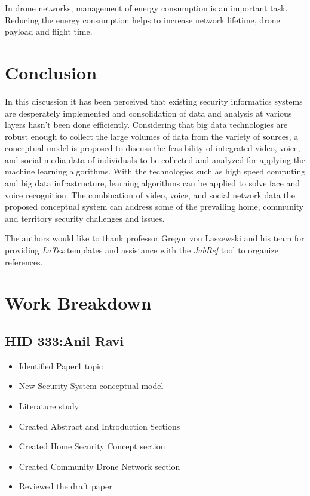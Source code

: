 \documentclass[sigconf]{acmart}
\begin{document}
In drone networks, management of energy consumption is an important task. Reducing the energy consumption helps to increase network lifetime, drone payload and flight time\cite{Gupta2015}.


\section{Conclusion}
In this discussion it has been perceived that existing security informatics systems are desperately implemented and consolidation of data and analysis at various layers hasn't been done efficiently. Considering that big data technologies are robust enough to collect the large volumes of data from the variety of sources, a conceptual model is proposed to discuss the feasibility of integrated video, voice, and social media data of individuals to be collected and analyzed for applying the machine learning algorithms. With the technologies such as high speed computing and big data infrastructure, learning algorithms can be applied to solve face and voice recognition. The combination of video, voice, and social network data the proposed conceptual system can address some of the prevailing home, community and territory security challenges and issues.

\begin{acks}
The authors would like to thank professor Gregor von Laszewski and his team for providing \textit{LaTex} templates and assistance with the \textit{JabRef} tool to organize references.
\end{acks}


 

\appendix
\section{Work Breakdown}
\subsection{HID 333:Anil Ravi}
\begin{itemize}
  \item Identified Paper1 topic
  \item New Security System conceptual model 
  \item Literature study
  \item Created Abstract and Introduction Sections
  \item Created Home Security Concept section
  \item Created Community Drone Network section
  \item Reviewed the draft paper
\end{itemize}
\end{document}

